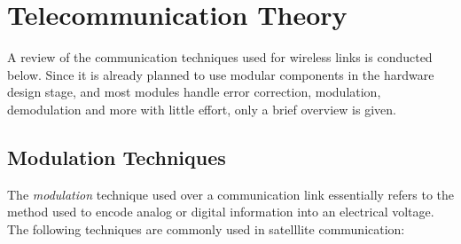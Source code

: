 \section{Telecommunication Theory}\label{sec:telecommunication_theory}
A review of the communication techniques used for wireless links is conducted below. Since it is already planned to use modular components in the hardware design stage, and most modules handle error correction, modulation, demodulation and more with little effort, only a brief overview is given.

\subsection{Modulation Techniques}
The \textit{modulation} technique used over a communication link essentially refers to the method used to encode analog or digital information into an electrical voltage. The following techniques are commonly used in satelllite communication:
\